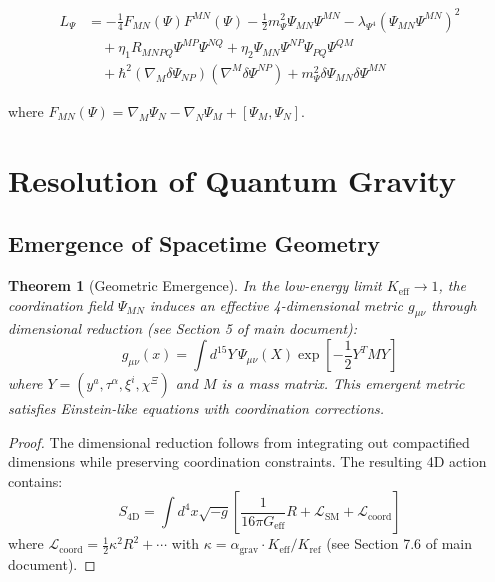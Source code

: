 \documentclass[12pt,a4paper]{article}
\newcommand{\eff}{\text{eff}}               %
\newcommand{\coord}{\text{coord}}           %
\newtheorem{theorem}{Theorem}[section]
\theoremstyle{remark}
\newcommand{\Keff}{K_{\mathrm{eff}}}
\begin{document}
	\begin{equation}
		\begin{aligned}
			L_{\Psi} &= -\frac{1}{4} F_{MN}(\Psi) F^{MN}(\Psi)
			- \frac{1}{2} m_{\Psi}^2 \Psi_{MN} \Psi^{MN}
			- \lambda_{\Psi^4} (\Psi_{MN}\Psi^{MN})^2 \\
			&\quad + \eta_1 R_{MNPQ} \Psi^{MP} \Psi^{NQ}
			+ \eta_2 \Psi_{MN}\Psi^{NP}\Psi_{PQ}\Psi^{QM} \\
			&\quad + \hbar^2 (\nabla_M \delta\Psi_{NP})(\nabla^M \delta\Psi^{NP})
			+ m_{\Psi}^2 \delta\Psi_{MN}\delta\Psi^{MN}
		\end{aligned}
	\end{equation}
	
	where $F_{MN}(\Psi) = \nabla_M \Psi_N - \nabla_N \Psi_M + [\Psi_M, \Psi_N]$.
	
	\section{Resolution of Quantum Gravity}
	\label{sec:quantum-gravity-resolution}
	
	\subsection{Emergence of Spacetime Geometry}
	
	\begin{theorem}[Geometric Emergence]
		In the low-energy limit $\Keff \to 1$, the coordination field $\Psi_{MN}$ induces an effective 4-dimensional metric $g_{\mu\nu}$ through dimensional reduction (see Section 5 of main document):
		\[
		g_{\mu\nu}(x) = \int d^{15}Y \, \Psi_{\mu\nu}(X) \exp\left[-\frac{1}{2}Y^T M Y\right]
		\]
		where $Y = (y^a, \tau^\alpha, \xi^i, \chi^\Xi)$ and $M$ is a mass matrix. This emergent metric satisfies Einstein-like equations with coordination corrections.
	\end{theorem}
	
	\begin{proof}
		The dimensional reduction follows from integrating out compactified dimensions while preserving coordination constraints. The resulting 4D action contains:
		\[
		S_{\text{4D}} = \int d^4x \sqrt{-g} \left[ \frac{1}{16\pi G_{\eff}} R + \mathcal{L}_{\text{SM}} + \mathcal{L}_{\coord} \right]
		\]
		where $\mathcal{L}_{\coord} = \frac{1}{2}\kappa^2 R^2 + \cdots$ with $\kappa = \alpha_{\text{grav}} \cdot \Keff/K_{\text{ref}}$ (see Section 7.6 of main document).
	\end{proof}
	
\end{document}
